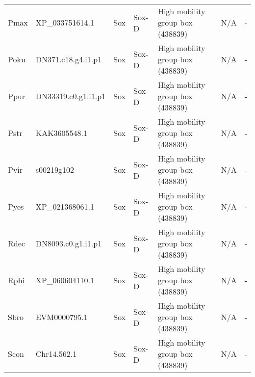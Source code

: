 \documentclass[../main.tex]{subfiles}
\begin{document}
\begin{landscape}
\begin{longtable}{lllllll}
		Pmax           & XP\_033751614.1       & Sox            & Sox-D               & High mobility group box (438839)            & N/A                                                                    & -                    \\
		Poku           & DN371.c18.g4.i1.p1    & Sox            & Sox-D               & High mobility group box (438839)            & N/A                                                                    & -                    \\
		Ppur           & DN33319.c0.g1.i1.p1   & Sox            & Sox-D               & High mobility group box (438839)            & N/A                                                                    & -                    \\
		Pstr           & KAK3605548.1          & Sox            & Sox-D               & High mobility group box (438839)            & N/A                                                                    & -                    \\
		Pvir           & s00219g102            & Sox            & Sox-D               & High mobility group box (438839)            & N/A                                                                    & -                    \\
		Pyes           & XP\_021368061.1       & Sox            & Sox-D               & High mobility group box (438839)            & N/A                                                                    & -                    \\
		Rdec           & DN8093.c0.g1.i1.p1    & Sox            & Sox-D               & High mobility group box (438839)            & N/A                                                                    & -                    \\
		Rphi           & XP\_060604110.1       & Sox            & Sox-D               & High mobility group box (438839)            & N/A                                                                    & -                    \\
		Sbro           & EVM0000795.1          & Sox            & Sox-D               & High mobility group box (438839)            & N/A                                                                    & -                    \\
		Scon           & Chr14.562.1           & Sox            & Sox-D               & High mobility group box (438839)            & N/A                                                                    & -                    \\

\end{longtable}
\end{landscape}
\end{document}
